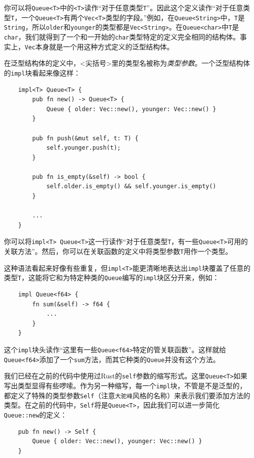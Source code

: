 你可以将\texttt{Queue<T>}中的\texttt{<T>}读作“对于任意类型\texttt{T}”。因此这个定义读作“对于任意类型\texttt{T}，一个\texttt{Queue<T>}有两个\texttt{Vec<T>}类型的字段。”例如，在\texttt{Queue<String>}中，\texttt{T}是\texttt{String}，所以\texttt{older}和\texttt{younger}的类型都是\texttt{Vec<String>}。在\texttt{Queue<char>}中\texttt{T}是\texttt{char}，我们就得到了一个和一开始的\texttt{char}类型特定的定义完全相同的结构体。事实上，\texttt{Vec}本身就是一个用这种方式定义的泛型结构体。

在泛型结构体的定义中，<尖括号>里的类型名被称为\emph{类型参数}。一个泛型结构体的\texttt{impl}块看起来像这样：
\begin{verbatim}
    impl<T> Queue<T> {
        pub fn new() -> Queue<T> {
            Queue { older: Vec::new(), younger: Vec::new() }
        }

        pub fn push(&mut self, t: T) {
            self.younger.push(t);
        }

        pub fn is_empty(&self) -> bool {
            self.older.is_empty() && self.younger.is_empty()
        }

        ...
    }
\end{verbatim}

你可以将\texttt{impl<T> Queue<T>}这一行读作“对于任意类型\texttt{T}，有一些\texttt{Queue<T>}可用的关联方法”。然后，你可以在关联函数的定义中将类型参数\texttt{T}用作一个类型。

这种语法看起来好像有些重复，但\texttt{impl<T>}能更清晰地表达出\texttt{impl}块覆盖了任意的类型\texttt{T}，这能将它和为特定种类的\texttt{Queue}编写的\texttt{impl}块区分开来，例如：
\begin{verbatim}
    impl Queue<f64> {
        fn sum(&self) -> f64 {
            ...
        }
    }
\end{verbatim}

这个\texttt{impl}块头读作“这里有一些\texttt{Queue<f64>}特定的管关联函数”。这样就给\texttt{Queue<f64>}添加了一个\texttt{sum}方法，而其它种类的\texttt{Queue}并没有这个方法。

我们已经在之前的代码中使用过Rust的\texttt{self}参数的缩写形式。这里\texttt{Queue<T>}如果写出类型显得有些啰嗦。作为另一种缩写，每一个\texttt{impl}块，不管是不是泛型的，都定义了特殊的类型参数\texttt{Self}（注意\texttt{大驼峰}风格的名称）来表示我们要添加方法的类型。在之前的代码中，\texttt{Self}将是\texttt{Queue<T>}，因此我们可以进一步简化\texttt{Queue::new}的定义：
\begin{verbatim}
    pub fn new() -> Self {
        Queue { older: Vec::new(), younger: Vec::new() }
    }
\end{verbatim}

